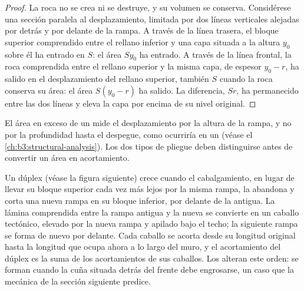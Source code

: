 \begin{proof}
La roca no se crea ni se destruye, y su volumen se conserva. Considérese una sección
paralela al desplazamiento, limitada por dos líneas verticales alejadas por detrás y por delante
de la rampa. A través de la línea trasera, el bloque superior comprendido entre el rellano
inferior y una capa situada a la altura $y_0$ sobre él ha entrado en $S$: el área
$Sy_0$ ha entrado. A través de la línea frontal, la roca comprendida entre el rellano
superior y la misma capa, de espesor $y_0 - r$, ha salido en el desplazamiento del rellano superior,
también $S$ cuando la roca conserva su área: el área $S(y_0 - r)$
ha salido. La diferencia, $Sr$, ha permanecido entre las dos líneas y eleva
la capa por encima de su nivel original.
\end{proof}

El área en exceso de un  mide el desplazamiento por la altura de
la rampa, y no por la profundidad hasta el despegue, como ocurriría en un
 (véase el \cref{ch:b3:structural-analysis}). Los dos tipos de pliegue
deben distinguirse antes de convertir un área en acortamiento.


Un dúplex (véase la figura siguiente) crece cuando el cabalgamiento, en lugar de llevar su bloque superior
cada vez más lejos por la misma rampa, la abandona y corta una nueva rampa en su bloque inferior,
por delante de la antigua. La lámina comprendida entre la rampa antigua y la nueva se convierte en un
caballo tectónico, elevado por la nueva rampa y apilado bajo el techo; la siguiente rampa
se forma de nuevo por delante. Cada caballo se acorta desde su longitud original hasta la
longitud que ocupa ahora a lo largo del muro, y el acortamiento del dúplex es
la suma de los acortamientos de sus caballos. Los  alteran este orden: se forman
cuando la cuña situada detrás del frente debe engrosarse, un caso que la mecánica de la
sección siguiente predice.


